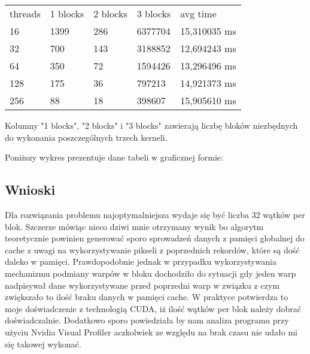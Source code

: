\documentclass[12pt]{article}
\begin{document}
			\begin{table}[htb]
			\begin{tabular}{lllll}
			\rowcolor[HTML]{cccccc} 
				threads & 1 blocks	& 2 blocks	& 3 blocks	& avg time\\
	 			16  	& 1399 		& 286		& 6377704	& 15,310035 ms \\
				32  	& 700		& 143		& 3188852	& 12,694243 ms \\
				64  	& 350		& 72		& 1594426	& 13,296496 ms \\
				128 	& 175		& 36		& 797213	& 14,921373 ms \\
				256 	& 88		& 18		& 398607	& 15,905610 ms 
			\end{tabular}
			\end{table} 
		
			Kolumny "1 blocks", "2 blocks" i "3 blocks" zawierają liczbę bloków niezbędnych do wykonania poszczególnych trzech kerneli. \newline
		
			Poniższy wykres prezentuje dane tabeli w graficznej formie:
			
			\begin{bchart}[step=4, max=16, unit=ms]
			\end{bchart}
		
		 \subsection{Wnioski}
		 
		 Dla rozwiązania problemu najoptymalniejsza wydaje się być liczba 32 wątków per blok. Szczerze mówiąc nieco dziwi mnie otrzymany wynik bo algorytm teoretycznie powinien generować sporo sprowadzeń danych z pamięci globalnej do cache z uwagi na wykorzystywanie pikseli z poprzednich rekordów, które są dość daleko w pamięci. Prawdopodobnie jednak w przypadku wykorzystywania mechanizmu podmiany warpów w bloku dochodziło do sytuacji gdy jeden warp nadpisywał dane wykorzystywane przed poprzedni warp w związku z czym zwiększało to ilość braku danych w pamięci cache. W praktyce potwierdza to moje doświadczenie z technologią CUDA, iż ilość wątków per blok należy dobrać doświadczalnie. Dodatkowo sporo powiedziała by nam analiza programu przy użyciu Nvidia Visual Profiler aczkolwiek ze względu na brak czasu nie udało mi się takowej wykonać.
\end{document}
